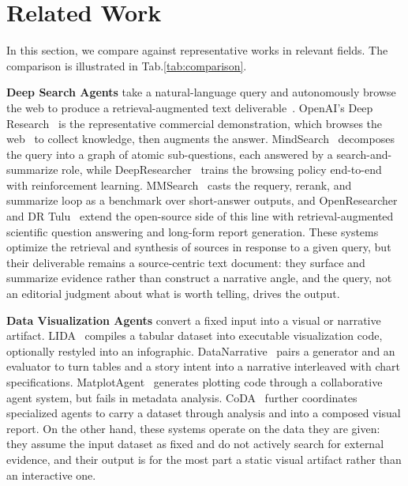 \section{Related Work}
\label{sec:related}


In this section, we compare \methodshort{} against representative works in relevant fields. The comparison is illustrated in Tab.\ref{tab:comparison}.

\textbf{Deep Search Agents}
\label{sec:related:search}
take a natural-language query and autonomously browse the web to produce a retrieval-augmented text deliverable~\cite{rag}.
OpenAI’s Deep Research~\citep{openaidr} is the representative commercial demonstration, which browses the web~\citep{browsecomp} to collect knowledge, then augments the answer.
MindSearch~\citep{mindsearch} decomposes the query into a graph of atomic sub-questions, each answered by a search-and-summarize role, while DeepResearcher~\citep{deepresearcher} trains the browsing policy end-to-end with reinforcement learning. MMSearch~\citep{mmsearch} casts the requery, rerank, and summarize loop as a benchmark over short-answer outputs, and OpenResearcher~\citep{openresearcher} and DR Tulu~\citep{drtulu} extend the open-source side of this line with retrieval-augmented scientific question answering and long-form report generation. 
These systems optimize the retrieval and synthesis of sources in response to a given query, but their deliverable remains a source-centric text document: they surface and summarize evidence rather than construct a narrative angle, and the query, not an editorial judgment about what is worth telling, drives the output.

\textbf{Data Visualization Agents}
\label{sec:related:design}
convert a fixed input into a visual or narrative artifact. 
LIDA~\citep{lida} compiles a tabular dataset into executable visualization code, optionally restyled into an infographic. 
DataNarrative~\citep{datanarrative} pairs a generator and an evaluator to turn tables and a story intent into a narrative interleaved with chart specifications.
MatplotAgent~\citep{matplotagent} generates plotting code through a collaborative agent system, but fails in metadata analysis.
CoDA~\citep{coda} further coordinates specialized agents to carry a dataset through analysis and into a composed visual report. 
On the other hand, 
these systems operate on the data they are given: they assume the input dataset as fixed and do not actively search for external evidence, and their output is for the most part a static visual artifact rather than an interactive one.

